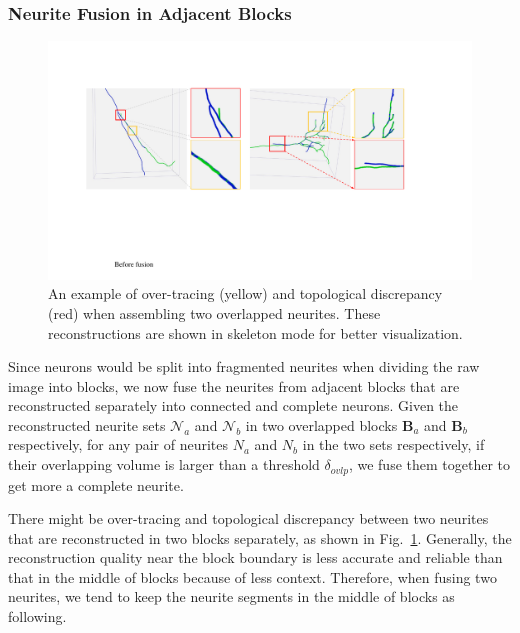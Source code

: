 \subsubsection{Neurite Fusion in Adjacent Blocks}
\label{sec:fusion}


\begin{figure}[b]
	\centering
	\includegraphics[width=0.9\columnwidth]{./Illustrations/fusion_errors.pdf}
	\caption{An example of over-tracing (yellow) and topological discrepancy (red) when assembling two overlapped neurites. These reconstructions are shown in skeleton mode for better visualization.}
	\label{fig:overlap_discrepancy}
\end{figure}
Since neurons would be split into fragmented neurites when dividing the raw image into blocks, we now fuse the neurites from adjacent blocks that are reconstructed separately into connected and complete neurons.
Given the reconstructed neurite sets $\mathcal{N}_a$ and $\mathcal{N}_b$ in two overlapped blocks $\mathbf{B}_a$ and $\mathbf{B}_b$ respectively, for any pair of neurites $N_a$ and $N_b$ in the two sets respectively, if their overlapping volume is larger than a threshold $\delta_{ovlp}$, we fuse them together to get more a complete neurite.

There might be over-tracing and topological discrepancy between two neurites that are reconstructed in two blocks separately, as shown in Fig.~\ref{fig:overlap_discrepancy}.
Generally, the reconstruction quality near the block boundary is less accurate and reliable than that in the middle of blocks because of less context. 
Therefore, when fusing two neurites, we tend to keep the neurite segments in the middle of blocks as following.
  
